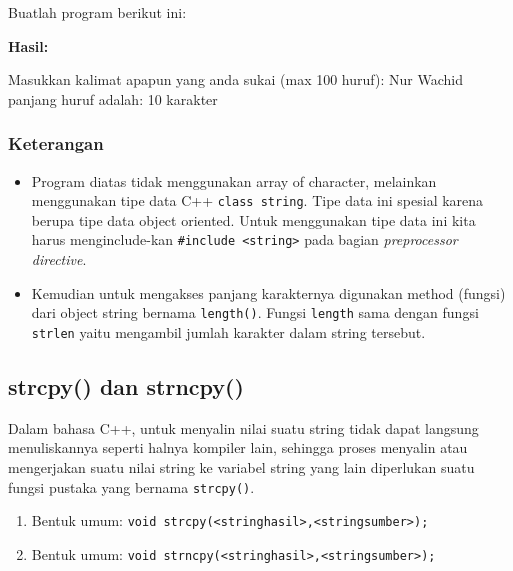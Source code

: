 {{Buatlah program berikut ini:



\textbf{Hasil:}

\begin{lcverbatim}
Masukkan kalimat apapun yang anda sukai
(max 100 huruf): Nur Wachid
panjang huruf adalah: 10 karakter
\end{lcverbatim}


\subsubsection*{Keterangan}

\begin{itemize}

\item
 Program diatas tidak menggunakan array of character, melainkan
 menggunakan tipe data C++ \texttt{class\ string}. Tipe data ini
 spesial karena berupa tipe data object oriented. Untuk menggunakan
 tipe data ini kita harus menginclude-kan
 \texttt{\#include\ \textless{}string\textgreater{}} pada bagian
 \emph{preprocessor directive}.
\item
 Kemudian untuk mengakses panjang karakternya digunakan method (fungsi)
 dari object string bernama \texttt{length()}. Fungsi \texttt{length}
 sama dengan fungsi \texttt{strlen} yaitu mengambil jumlah karakter
 dalam string tersebut.
\end{itemize}

\subsection{strcpy() dan strncpy()}\label{strcpy-dan-strncpy}

Dalam bahasa C++, untuk menyalin nilai suatu string tidak dapat langsung
menuliskannya seperti halnya kompiler lain, sehingga proses menyalin
atau mengerjakan suatu nilai string ke variabel string yang lain
diperlukan suatu fungsi pustaka yang bernama \texttt{strcpy()}.

\begin{enumerate}

\item
 Bentuk umum:
 \texttt{void\ strcpy(\textless{}stringhasil\textgreater{},\textless{}stringsumber\textgreater{});}
\item
 Bentuk umum:
 \texttt{void\ strncpy(\textless{}stringhasil\textgreater{},\textless{}stringsumber\textgreater{});}
\end{enumerate}

}}
